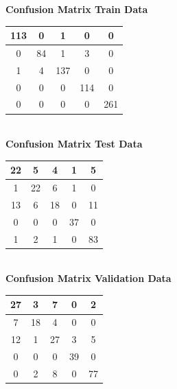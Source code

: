 \documentclass{article}
\begin{document}
\begin{flushleft}
\textbf{Confusion Matrix Train Data\\[5pt]}
\begin{tabular}{|c|c|c|c|c|}
\hline
113 & 0 & 1 & 0 & 0 \\
\hline
0 & 84 & 1 & 3 & 0 \\
\hline
1 & 4 & 137 & 0 & 0\\
\hline
0 & 0 & 0 & 114 & 0\\
\hline
0 & 0 & 0 & 0 & 261 \\
\hline
\end{tabular}
\textbf{\\[10pt] Confusion Matrix Test Data \\[5pt]}
\begin{tabular}{|c|c|c|c|c|}
\hline
22 & 5 & 4 & 1 & 5\\
\hline
1 & 22 & 6 & 1 & 0 \\
\hline
13 & 6 & 18 & 0 & 11 \\
\hline
0 & 0 & 0 & 37 & 0 \\
\hline
1 & 2 & 1 & 0 & 83 \\
\hline
\end{tabular}
\textbf{\\[10pt] Confusion Matrix Validation Data \\[5pt]}
\begin{tabular}{|c|c|c|c|c|}
\hline
27 & 3 & 7 & 0 & 2 \\
\hline
7 & 18 & 4 & 0 & 0 \\
\hline
12 & 1 & 27 & 3 & 5 \\
\hline
0 & 0 & 0 & 39 & 0 \\
\hline
0 & 2 & 8 & 0 & 77 \\
\hline
\end{tabular}
\end{flushleft}
\end{document}
